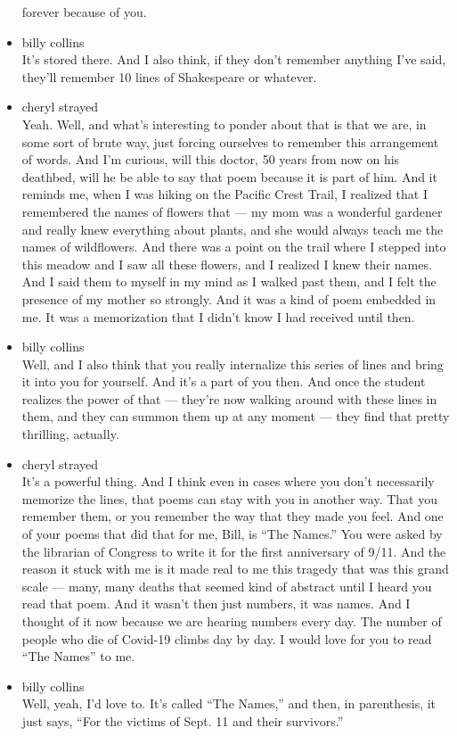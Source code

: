 \begin{itemize}
  forever because of you.
\item
  billy collins\\
  It's stored there. And I also think, if they don't remember anything
  I've said, they'll remember 10 lines of Shakespeare or whatever.
\item
  cheryl strayed\\
  Yeah. Well, and what's interesting to ponder about that is that we
  are, in some sort of brute way, just forcing ourselves to remember
  this arrangement of words. And I'm curious, will this doctor, 50 years
  from now on his deathbed, will he be able to say that poem because it
  is part of him. And it reminds me, when I was hiking on the Pacific
  Crest Trail, I realized that I remembered the names of flowers that
  --- my mom was a wonderful gardener and really knew everything about
  plants, and she would always teach me the names of wildflowers. And
  there was a point on the trail where I stepped into this meadow and I
  saw all these flowers, and I realized I knew their names. And I said
  them to myself in my mind as I walked past them, and I felt the
  presence of my mother so strongly. And it was a kind of poem embedded
  in me. It was a memorization that I didn't know I had received until
  then.
\item
  billy collins\\
  Well, and I also think that you really internalize this series of
  lines and bring it into you for yourself. And it's a part of you then.
  And once the student realizes the power of that --- they're now
  walking around with these lines in them, and they can summon them up
  at any moment --- they find that pretty thrilling, actually.
\item
  cheryl strayed\\
  It's a powerful thing. And I think even in cases where you don't
  necessarily memorize the lines, that poems can stay with you in
  another way. That you remember them, or you remember the way that they
  made you feel. And one of your poems that did that for me, Bill, is
  ``The Names.'' You were asked by the librarian of Congress to write it
  for the first anniversary of 9/11. And the reason it stuck with me is
  it made real to me this tragedy that was this grand scale --- many,
  many deaths that seemed kind of abstract until I heard you read that
  poem. And it wasn't then just numbers, it was names. And I thought of
  it now because we are hearing numbers every day. The number of people
  who die of Covid-19 climbs day by day. I would love for you to read
  ``The Names'' to me.
\item
  billy collins\\
  Well, yeah, I'd love to. It's called ``The Names,'' and then, in
  parenthesis, it just says, ``For the victims of Sept. 11 and their
  survivors.''


\end{itemize}
